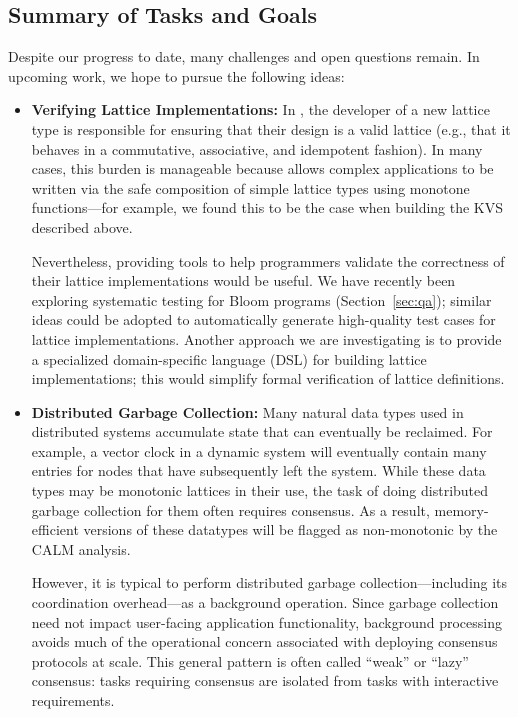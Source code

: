\subsection{Summary of Tasks and Goals}
Despite our progress to date, many challenges and open questions remain.  In upcoming work, we hope to pursue the following ideas:
\begin{itemize}
\item \textbf{Verifying Lattice Implementations:} In \blooml, the developer of a
  new lattice type is responsible for ensuring that their design is a valid
  lattice (e.g., that it behaves in a commutative, associative, and idempotent
  fashion). In many cases, this burden is manageable because \blooml allows
  complex applications to be written via the safe composition of simple lattice
  types using monotone functions---for example, we found this to be the case
  when building the KVS described above.

  Nevertheless, providing tools to help programmers validate the correctness
  of their lattice implementations would be useful. We have recently been
  exploring systematic testing for Bloom programs (Section~\ref{sec:qa});
  similar ideas could be adopted to automatically generate high-quality test
  cases for lattice implementations. Another approach we are investigating is to
  provide a specialized domain-specific language (DSL) for building lattice
  implementations; this would simplify formal verification of lattice
  definitions.

\item \textbf{Distributed Garbage Collection:} Many natural data types used in distributed systems
  accumulate state that can eventually be reclaimed. For example, a vector clock
  in a dynamic system will eventually contain many entries for nodes that have
  subsequently left the system. While these data types may be monotonic lattices in their use, the task of doing distributed garbage collection for them often
  requires consensus. As a result, memory-efficient versions of these datatypes will be flagged as non-monotonic
  by the CALM analysis.

  However, it is typical to perform distributed garbage collection---including its
  coordination overhead---as a background operation. Since garbage collection
  need not impact user-facing application functionality, background processing
  avoids much of the operational concern associated with deploying consensus
  protocols at scale. This general pattern is often called ``weak'' or ``lazy''
  consensus: tasks requiring consensus are isolated from tasks with interactive
  requirements.


\end{itemize}
